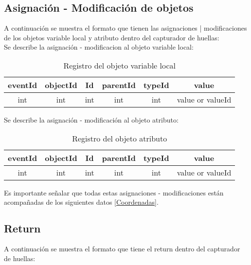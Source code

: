 \documentclass[10pt,a4paper]{article}
\begin{document}
\subsection{Asignación - Modificación de objetos}
A continuación se muestra el formato que tienen las asignaciones | modificaciones de los objetos variable local y atributo dentro del capturador de huellas:\\

Se describe la asignación - modificacion al objeto variable local:\\

\begin{table}[!h]
\begin{center}
\begin{tabular}{| c | c | c | c | c | c |}
\hline
eventId & objectId & Id & parentId & typeId & value\\
\hline
int & int & int & int & int & value or valueId\footnotemark[1]\\
\hline
\end{tabular}
\caption{Registro del objeto variable local} 
\end{center}
\end{table}

Se describe la asignación - modificación al objeto atributo:\\

\begin{table}[!h]
\begin{center}
\begin{tabular}{| c | c | c | c | c | c |}
\hline
eventId & objectId & Id & parentId & typeId & value\\
\hline
int & int & int & int & int & value or valueId\footnotemark[1]\\
\hline
\end{tabular}
\caption{Registro del objeto atributo} 
\end{center}
\end{table}

Es importante señalar que todas estas asignaciones - modificaciones están acompañadas de los siguientes datos \ref{Coordenadas}.

\subsection{Return}

A continuación se muestra el formato que tiene el return dentro del capturador de huellas:\\
\end{document}

